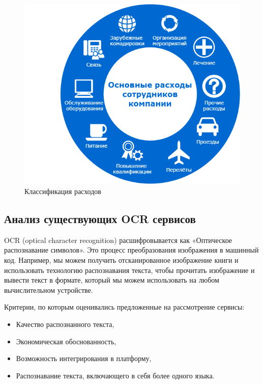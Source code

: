 \documentclass[14pt]{mmcs_article}
\begin{document}
\begin{figure}[H]
  \centering
  \includegraphics[scale=0.5]{dia.png}
  \caption{Классификация расходов}\label{stud:fig:101}
\end{figure}
\subsection{Анализ существующих OCR сервисов}
OCR (optical character recognition) расшифровывается как «Оптическое распознавание символов». Это процесс преобразования изображения в машинный код. Например, мы можем получить отсканированное изображение книги и использовать технологию распознавания текста, чтобы прочитать изображение и вывести текст в формате, который мы можем использовать на любом вычислительном устройстве.

Критерии, по которым оценивались предложенные на рассмотрение сервисы:
\begin{itemize}
\item Качество распознанного текста,
\item Экономическая обоснованность,
\item Возможность интегрирования в платформу,
\item Распознавание текста, включающего в себя более одного языка.
\end{itemize}
\end{document}
